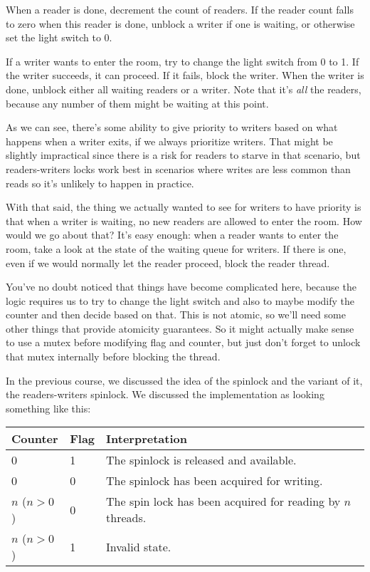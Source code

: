 When a reader is done, decrement the count of readers. If the reader count falls to zero when this reader is done, unblock a writer if one is waiting, or otherwise set the light switch to 0.

If a writer wants to enter the room, try to change the light switch from 0 to 1. If the writer succeeds, it can proceed. If it fails, block the writer. When the writer is done, unblock either all waiting readers or a writer. Note that it's \textit{all} the readers, because any number of them might be waiting at this point.

As we can see, there's some ability to give priority to writers based on what happens when a writer exits, if we always prioritize writers. That might be slightly impractical since there is a risk for readers to starve in that scenario, but readers-writers locks work best in scenarios where writes are less common than reads so it's unlikely to happen in practice.  

With that said, the thing we actually wanted to see for writers to have priority is that when a writer is waiting, no new readers are allowed to enter the room. How would we go about that? It's easy enough: when a reader wants to enter the room, take a look at the state of the waiting queue for writers. If there is one, even if we would normally let the reader proceed, block the reader thread.

You've no doubt noticed that things have become complicated here, because the logic requires us to try to change the light switch and also to maybe modify the counter and then decide based on that. This is not atomic, so we'll need some other things that provide atomicity guarantees. So it might actually make sense to use a mutex before modifying flag and counter, but just don't forget to unlock that mutex internally before blocking the thread.

In the previous course, we discussed the idea of the spinlock and the variant of it, the readers-writers spinlock. We discussed the implementation as looking something like this:

\begin{center}
	\begin{tabular}{l|l|l}
		\textbf{Counter} & \textbf{Flag} & \textbf{Interpretation}                                     \\\hline
		0                & 1             & The spinlock is released and available.                     \\
		0                & 0             & The spinlock has been acquired for writing.                 \\
		$n$ ($n > 0$)    & 0             & The spin lock has been acquired for reading by $n$ threads. \\
		$n$ ($n > 0$)    & 1             & Invalid state.                                              \\
	\end{tabular}
\end{center}

